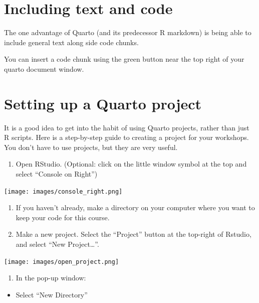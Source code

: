 \documentclass[
  letterpaper,
  DIV=11,
  numbers=noendperiod]{scrreprt}
\providecommand{\tightlist}{%
  \setlength{\itemsep}{0pt}\setlength{\parskip}{0pt}}\usepackage{longtable,booktabs,array}
\begin{document}
\hypertarget{including-text-and-code}{%
\chapter{Including text and code}\label{including-text-and-code}}

The one advantage of Quarto (and its predecessor R markdown) is being
able to include general text along side code chunks.

You can insert a code chunk using the green button near the top right of
your quarto document window.

\hypertarget{setting-up-a-quarto-project}{%
\chapter{Setting up a Quarto
project}\label{setting-up-a-quarto-project}}

It is a good idea to get into the habit of using Quarto projects, rather
than just R scripts. Here is a step-by-step guide to creating a project
for your workshops. You don't have to use projects, but they are very
useful.

\begin{enumerate}
\def\labelenumi{\arabic{enumi}.}
\tightlist
\item
  Open RStudio. (Optional: click on the little window symbol at the top
  and select ``Console on Right'')
\end{enumerate}

\texttt{[image: images/console\_right.png]}

\begin{enumerate}
\def\labelenumi{\arabic{enumi}.}
\setcounter{enumi}{1}
\item
  If you haven't already, make a directory on your computer where you
  want to keep your code for this course.
\item
  Make a new project. Select the ``Project'' button at the top-right of
  Rstudio, and select ``New Project\ldots{}''.
\end{enumerate}

\texttt{[image: images/open\_project.png]}

\begin{enumerate}
\def\labelenumi{\arabic{enumi}.}
\setcounter{enumi}{3}
\tightlist
\item
  In the pop-up window:
\end{enumerate}

\begin{itemize}
\tightlist
\item
  Select ``New Directory''
\end{itemize}
\end{document}
